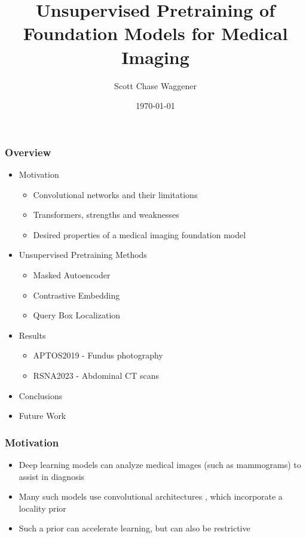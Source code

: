 \documentclass{beamer}
\title{Unsupervised Pretraining of Foundation Models for Medical Imaging}
\author{Scott Chase Waggener}
\date{\today}
\begin{document}
\frame{\titlepage}

\begin{frame}
   \frametitle{Overview}
   \begin{itemize}
        \item Motivation
        \begin{itemize}
            \item Convolutional networks and their limitations
            \item Transformers, strengths and weaknesses
            \item Desired properties of a medical imaging foundation model
        \end{itemize}
        \item Unsupervised Pretraining Methods
        \begin{itemize}
            \item Masked Autoencoder
            \item Contrastive Embedding
            \item Query Box Localization
        \end{itemize}
        \item Results
        \begin{itemize}
            \item APTOS2019 - Fundus photography
            \item RSNA2023 - Abdominal CT scans
        \end{itemize}
        \item Conclusions
        \item Future Work
   \end{itemize}
\end{frame}


\begin{frame}
   \frametitle{Motivation}
   \begin{itemize}
        \item Deep learning models can analyze medical images (such as mammograms) to assist in diagnosis \cite{McKinney2020}
        \item Many such models use convolutional architectures \cite{COGAN201918}, which incorporate a locality prior
        \item Such a prior can accelerate learning, but can also be restrictive
   \end{itemize}
\end{frame}
\end{document}
